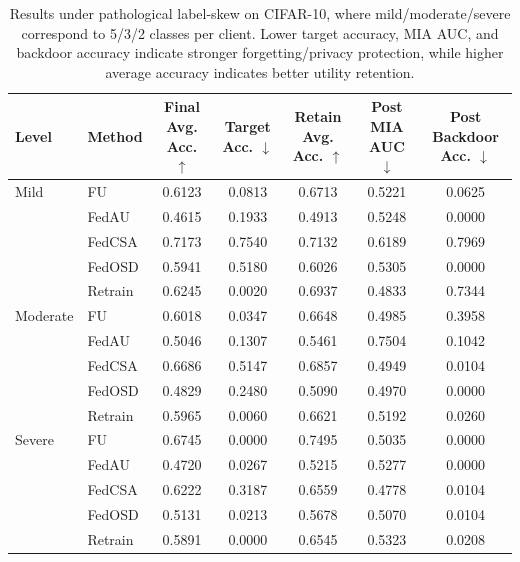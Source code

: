 \begin{table}[t]
\centering
\caption{Results under pathological label-skew on CIFAR-10, where mild/moderate/severe correspond to 5/3/2 classes per client. Lower target accuracy, MIA AUC, and backdoor accuracy indicate stronger forgetting/privacy protection, while higher average accuracy indicates better utility retention.}
\label{tab:heterogeneity_results}
\begin{tabular}{llccccc}
\toprule
Level & Method & Final Avg. Acc. $\uparrow$ & Target Acc. $\downarrow$ & Retain Avg. Acc. $\uparrow$ & Post MIA AUC $\downarrow$ & Post Backdoor Acc. $\downarrow$ \\
\midrule
Mild & FU & 0.6123 & 0.0813 & 0.6713 & 0.5221 & 0.0625 \\
 & FedAU & 0.4615 & 0.1933 & 0.4913 & 0.5248 & 0.0000 \\
 & FedCSA & 0.7173 & 0.7540 & 0.7132 & 0.6189 & 0.7969 \\
 & FedOSD & 0.5941 & 0.5180 & 0.6026 & 0.5305 & 0.0000 \\
 & Retrain & 0.6245 & 0.0020 & 0.6937 & 0.4833 & 0.7344 \\
\midrule
Moderate & FU & 0.6018 & 0.0347 & 0.6648 & 0.4985 & 0.3958 \\
 & FedAU & 0.5046 & 0.1307 & 0.5461 & 0.7504 & 0.1042 \\
 & FedCSA & 0.6686 & 0.5147 & 0.6857 & 0.4949 & 0.0104 \\
 & FedOSD & 0.4829 & 0.2480 & 0.5090 & 0.4970 & 0.0000 \\
 & Retrain & 0.5965 & 0.0060 & 0.6621 & 0.5192 & 0.0260 \\
\midrule
Severe & FU & 0.6745 & 0.0000 & 0.7495 & 0.5035 & 0.0000 \\
 & FedAU & 0.4720 & 0.0267 & 0.5215 & 0.5277 & 0.0000 \\
 & FedCSA & 0.6222 & 0.3187 & 0.6559 & 0.4778 & 0.0104 \\
 & FedOSD & 0.5131 & 0.0213 & 0.5678 & 0.5070 & 0.0104 \\
 & Retrain & 0.5891 & 0.0000 & 0.6545 & 0.5323 & 0.0208 \\
\bottomrule
\end{tabular}
\end{table}